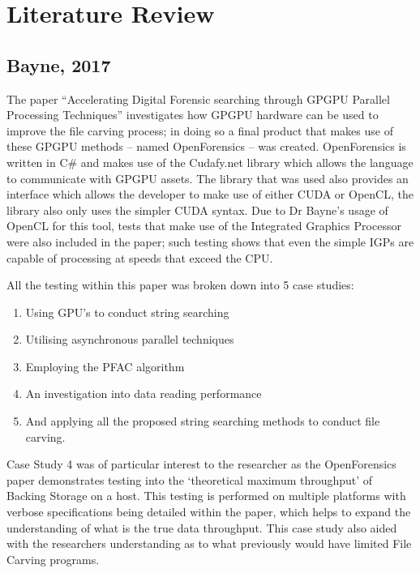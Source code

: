 
\chapter{Literature Review}
\label{chap:chapter2}
\section*{Bayne, 2017}
The paper ``Accelerating Digital Forensic searching through \ac{GPGPU} Parallel Processing Techniques'' investigates how \ac{GPGPU} hardware can be used to improve the file carving process; in doing so a final product that makes use of these \ac{GPGPU} methods -- named OpenForensics -- was created.
OpenForensics is written in C\# and makes use of the Cudafy.net library which allows the language to communicate with \ac{GPGPU} assets.
The library that was used also provides an interface which allows the developer to make use of either CUDA or OpenCL, the library also only uses the simpler CUDA syntax.
Due to Dr Bayne’s usage of OpenCL for this tool, tests that make use of the Integrated Graphics Processor were also included in the paper; such testing shows that even the simple \ac{IGP}s are capable of processing at speeds that exceed the \ac{CPU}.

All the testing within this paper was broken down into 5 case studies:
\begin{enumerate}[noitemsep, topsep=0pt]
    \item Using \ac{GPU}'s to conduct string searching
    \item Utilising asynchronous parallel techniques
    \item Employing the \ac{PFAC} algorithm
    \item An investigation into data reading performance
    \item And applying all the proposed string searching methods to conduct file carving.
\end{enumerate}

Case Study 4 was of particular interest to the researcher as the OpenForensics paper demonstrates testing into the `theoretical maximum throughput’ of Backing Storage on a host.
This testing is performed on multiple platforms with verbose specifications being detailed within the paper,
which helps to expand the understanding of what is the true data throughput.
This case study also aided with the researchers understanding as to what previously would have limited File Carving programs.

